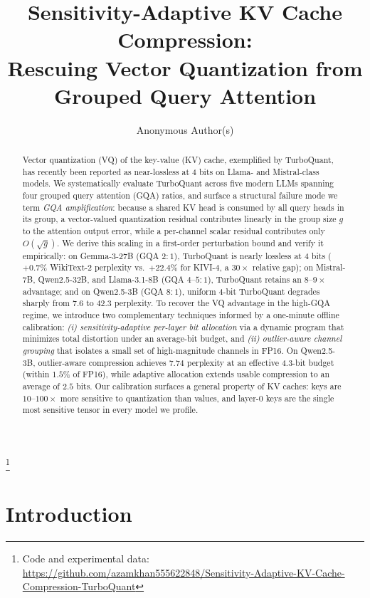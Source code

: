 \documentclass[11pt]{article}
\title{Sensitivity-Adaptive KV Cache Compression:\\
Rescuing Vector Quantization from Grouped Query Attention}
\author{Anonymous Author(s)}
\date{}
\newcommand{\blfootnote}[1]{%
  \begingroup
  \renewcommand\thefootnote{}\footnote{#1}%
  \addtocounter{footnote}{-1}%
  \endgroup
}
\begin{document}
\maketitle
\blfootnote{Code and experimental data: \url{https://github.com/azamkhan555622848/Sensitivity-Adaptive-KV-Cache-Compression-TurboQuant}}

\begin{abstract}
Vector quantization (VQ) of the key-value (KV) cache, exemplified by
TurboQuant, has recently been reported as near-lossless at 4 bits on Llama-
and Mistral-class models. We systematically evaluate TurboQuant across five
modern LLMs spanning four grouped query attention (GQA) ratios, and surface a
structural failure mode we term \emph{GQA amplification}: because a shared KV
head is consumed by all query heads in its group, a vector-valued
quantization residual contributes linearly in the group size $g$ to the
attention output error, while a per-channel scalar residual contributes only
$O(\sqrt{g})$. We derive this scaling in a first-order perturbation bound and
verify it empirically: on Gemma-3-27B (GQA $2{:}1$), TurboQuant is nearly
lossless at 4 bits ($+0.7\%$ WikiText-2 perplexity vs.\ $+22.4\%$ for KIVI-4,
a $30\times$ relative gap); on Mistral-7B, Qwen2.5-32B, and Llama-3.1-8B (GQA
$4$--$5{:}1$), TurboQuant retains an $8$--$9\times$ advantage; and on
Qwen2.5-3B (GQA $8{:}1$), uniform 4-bit TurboQuant degrades sharply from
$7.6$ to $42.3$ perplexity. To recover the VQ advantage in the high-GQA
regime, we introduce two complementary techniques informed by a one-minute
offline calibration: \emph{(i) sensitivity-adaptive per-layer bit allocation}
via a dynamic program that minimizes total distortion under an average-bit
budget, and \emph{(ii) outlier-aware channel grouping} that isolates a small
set of high-magnitude channels in FP16. On Qwen2.5-3B, outlier-aware
compression achieves $7.74$ perplexity at an effective 4.3-bit budget
(within $1.5\%$ of FP16), while adaptive allocation extends usable
compression to an average of $2.5$ bits. Our calibration surfaces a general
property of KV caches: keys are $10$--$100\times$ more sensitive to
quantization than values, and layer-0 keys are the single most sensitive
tensor in every model we profile.
\end{abstract}

\section{Introduction}
\label{sec:intro}
\end{document}
